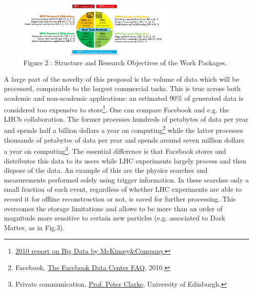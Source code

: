   \begin{figure}
	\includegraphics[width=0.7\textwidth]{figs/WPs} %
	\caption*{Figure 2 : Structure and Research Objectives of the Work Packages.\label{fig:WPs}}
\end{figure}
A large part of the novelty of this proposal is the volume of data which will be processed, comparable to the largest commercial tasks. 
This is true across both academic and non-academic applications:
an estimated 90$\%$ of generated data is considered too expensive to store\footnote{\href{http://www.mckinsey.com/insights/business_technology/big_data_the_next_frontier_for_innovation}{2010 report on Big Data by McKinsey\&Company.}}.
One can compare Facebook and e.g. the LHCb collaboration.
The former processes hundreds of petabytes of data per year and spends half a billion dollars a year on computing\footnote{Facebook, \href{http://www.datacenterknowledge.com/the-facebook-data-center-faq-page-three/}{The Facebook Data Center FAQ}, 2010.} while the latter processes thousands of petabytes of data per year and spends around seven million dollars a year on computing\footnote{Private communication, \href{mailto:peter.clarke@ed.ac.uk}{Prof. Peter Clarke}, University of Edinburgh.}.
The essential difference is that Facebook stores and distributes this data to its users while LHC experiments largely process and then dispose of the data.
An example of this are the physics searches and measurements performed solely using trigger information.
In these searches only a small fraction of each event, regardless of whether LHC experiments are able to record it for offline reconstruction or not, is saved for further processing. 
This overcomes the storage limitations and allows to be more than an order of magnitude more sensitive to certain new particles (e.g. associated to Dark Matter, as in Fig.3).

